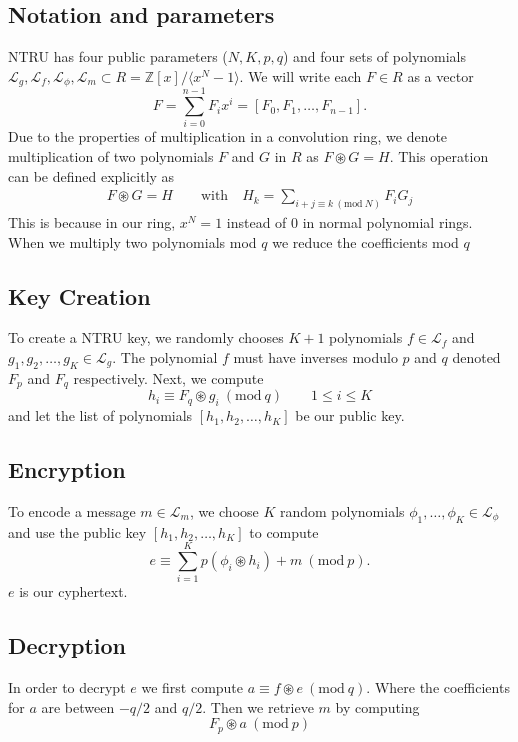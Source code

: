 \documentclass[12pt]{amsart}
\theoremstyle{definition}
\theoremstyle{remark}
\newcommand{\Z}{\mathbb{Z}}
\newcommand{\Mod}[1]{\ (\mathrm{mod}\ #1)}
\begin{document}
\subsection{Notation and parameters} 
NTRU has four public parameters ($N,K,p,q$) and four sets of polynomials $\mathscr{L}_g,\mathscr{L}_f, \mathscr{L}_\phi,\mathscr{L}_m \subset R = \Z[x]/\langle x^N - 1\rangle$. \cite{NTRUpatent} We will write each $F\in R$ as a vector 
$$F = \sum_{i=0}^{n-1}F_ix^i = [F_0,F_1,\dots,F_{n-1}].$$
Due to the properties of multiplication in a convolution ring, we denote multiplication of two polynomials $F$ and $G$ in $R$ as $F\circledast G = H$. This operation can be defined explicitly as
\begin{align}
    F\circledast G = H \qquad \text{with}\quad H_k = \sum_{i+j\equiv k \Mod{N}}F_iG_j
\end{align}
This is because in our ring, $x^N = 1$ instead of $0$ in normal polynomial rings. When we multiply two polynomials mod $q$ we reduce the coefficients mod $q$
\subsection{Key Creation}
To create a NTRU key, we randomly chooses $K+1$ polynomials $f\in\mathscr{L}_f$ and $g_1,g_2,\dots,g_K\in\mathscr{L}_g$. The polynomial $f$ must have inverses modulo $p$ and $q$ denoted $F_p$ and $F_q$ respectively. Next, we compute 
\begin{equation}
    h_i \equiv F_q \circledast g_i\Mod{q} \qquad 1\leq i \leq K
\end{equation}
and let the list of polynomials $[h_1,h_2,\dots,h_K]$ be our public key.\cite{NTRUpatent}
\subsection{Encryption}
To encode a message $m\in\mathscr{L}_m$, we choose $K$ random polynomials $\phi_1,\dots,\phi_K\in\mathscr{L}_\phi$ and use the public key $[h_1,h_2,\dots,h_K]$ to compute 
$$e \equiv \sum_{i=1}^K p(\phi_i\circledast h_i) + m \Mod{p}.$$
$e$ is our cyphertext. \cite{NTRUpatent}
\subsection{Decryption}
In order to decrypt $e$ we first compute $a \equiv f \circledast e \Mod{q}$. Where the coefficients for $a$ are between $-q/2$ and $q/2$. Then we retrieve $m$ by computing \cite{NTRUpatent} 
\begin{equation}
    F_p\circledast a \Mod{p}
\end{equation}
\end{document}
